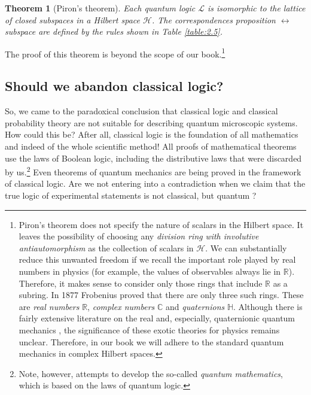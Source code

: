 \documentclass[nochecklpage]{stefan1}
\newtheorem{theorem}{Theorem}[chapter]
\theoremstyle{definition}
\begin{document}
\begin{theorem}[Piron's theorem]
\label{Theorem.Piron}
Each quantum logic $ \mathcal{L} $ is isomorphic to the lattice of
closed subspaces in a Hilbert space $ \mathscr{H} $. The correspondences
proposition $\leftrightarrow $ subspace are defined by the rules shown in
Table \ref{table:2.5}.
\end{theorem}


The proof of this theorem is beyond the scope of our
book.\footnote{Piron's theorem does not specify the nature of scalars
in the Hilbert space. It leaves the possibility of choosing any
\emph{division ring} \emph{with involutive antiautomorphism} as the
collection of scalars in $ \mathscr{H} $. We can substantially reduce
this unwanted freedom if we recall the important role played by real
numbers in physics (for example, the values of observables always lie
in $ \mathbb{R} $). Therefore, it makes sense to consider only those
rings that include $ \mathbb{R} $ as a subring. In 1877 Frobenius proved
that there are only three such rings. These are \emph{real numbers}
$ \mathbb{R} $, \emph{complex numbers}\label{lb:complex}\label{lb:real}
$\mathbb{C} $ and \emph{quaternions} $ \mathbb{H} $.
Although there is fairly extensive literature on the real and,
especially, quaternionic quantum mechanics
\cite{Stueckelberg,quaternionic,Moretti, Moretti2}, the significance of
these exotic theories for physics remains unclear. Therefore, in our
book we will adhere to the standard quantum mechanics in complex Hilbert
spaces.}

\subsection{Should we abandon classical logic?}\label{ss:shouldwe}
So, we came to the paradoxical conclusion that classical logic and
classical probability theory are not suitable for describing quantum
microscopic systems. How could this be? After all, classical logic is
the foundation of all mathematics and indeed of the whole scientific
method! All proofs of mathematical theorems use the laws of Boolean
logic, including the distributive laws that were discarded by
us.\footnote{Note, however, attempts \cite{Dejonghe} to develop
the so-called \emph{quantum mathematics}, which is based on the laws of
quantum logic.} Even theorems of quantum mechanics are being proved in
the framework of classical logic. Are we not entering into a
contradiction when we claim that the true logic of experimental
statements is not classical, but quantum \cite{Putnam}?
\end{document}

